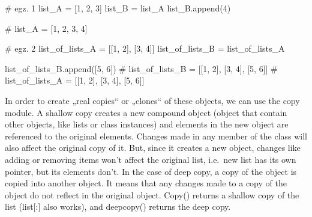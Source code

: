 \documentclass[
  letterpaper,
  DIV=11,
  numbers=noendperiod]{scrreprt}
\newenvironment{Shaded}{\begin{snugshade}}{\end{snugshade}}
\newcommand{\CommentTok}[1]{\textcolor[rgb]{0.37,0.37,0.37}{#1}}
\newcommand{\DecValTok}[1]{\textcolor[rgb]{0.68,0.00,0.00}{#1}}
\newcommand{\NormalTok}[1]{\textcolor[rgb]{0.00,0.23,0.31}{#1}}
\newcommand{\OperatorTok}[1]{\textcolor[rgb]{0.37,0.37,0.37}{#1}}
\begin{document}
\begin{Shaded}
\begin{Highlighting}[]
\CommentTok{\# egz. 1}
\NormalTok{list\_A }\OperatorTok{=}\NormalTok{ [}\DecValTok{1}\NormalTok{, }\DecValTok{2}\NormalTok{, }\DecValTok{3}\NormalTok{]}
\NormalTok{list\_B }\OperatorTok{=}\NormalTok{ list\_A}
\NormalTok{list\_B.append(}\DecValTok{4}\NormalTok{)}

\CommentTok{\# list\_A = [1, 2, 3, 4]}
\end{Highlighting}
\end{Shaded}

\begin{Shaded}
\begin{Highlighting}[]
\CommentTok{\# egz. 2}
\NormalTok{list\_of\_lists\_A }\OperatorTok{=}\NormalTok{ [[}\DecValTok{1}\NormalTok{, }\DecValTok{2}\NormalTok{], [}\DecValTok{3}\NormalTok{, }\DecValTok{4}\NormalTok{]]}
\NormalTok{list\_of\_lists\_B }\OperatorTok{=}\NormalTok{ list\_of\_lists\_A}

\NormalTok{list\_of\_lists\_B.append([}\DecValTok{5}\NormalTok{, }\DecValTok{6}\NormalTok{])}
\CommentTok{\# list\_of\_lists\_B = [[1, 2], [3, 4], [5, 6]]}
\CommentTok{\# list\_of\_lists\_A = [[1, 2], [3, 4], [5, 6]]}
\end{Highlighting}
\end{Shaded}

In order to create „real copies`` or „clones`` of these objects, we can
use the copy module. A shallow copy creates a new compound object
(object that contain other objects, like lists or class instances) and
elements in the new object are referenced to the original elements.
Changes made in any member of the class will also affect the original
copy of it. But, since it creates a new object, changes like adding or
removing items won't affect the original list, i.e.~new list has its own
pointer, but its elements don't. In the case of deep copy, a copy of the
object is copied into another object. It means that any changes made to
a copy of the object do not reflect in the original object. Copy()
returns a shallow copy of the list (list{[}:{]} also works), and
deepcopy() returns the deep copy.
\end{document}
